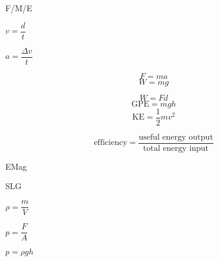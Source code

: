 \documentclass[11pt,a4paper]{article}
\begin{document}
\noindent\begin{paracol}{3}
F/M/E 
\switchcolumn 
\begin{center}
$v = \dfrac{d}{t}$
\end{center}
\switchcolumn
\begin{center}
$a = \dfrac{\Delta v}{t}$
\end{center}
\end{paracol}

\vspace*{1em}

\noindent\begin{paracol}{4}

\switchcolumn 
\[F = ma\]
\switchcolumn
\[W=mg\]
\end{paracol}

\vspace*{1em}

\noindent\begin{paracol}{4}

\switchcolumn 
\[W = Fd\]
\switchcolumn
\[\text{GPE}=mgh\]
\switchcolumn
\[\text{KE}=\frac{1}{2}mv^{2}\]
\end{paracol}

\vspace*{1em}

\noindent\begin{paracol}{2}

\switchcolumn 
\[\text{efficiency} = \frac{\text{useful energy output}}{\text{total energy input}}\]
\end{paracol}


\vspace*{1em}

\hrulefill

\vspace*{1em}

\noindent\begin{paracol}{4}
EMag
\end{paracol}

\vspace*{1em}

\hrulefill

\vspace*{1em}

\noindent\begin{paracol}{4}
SLG
\switchcolumn 
\begin{center}
$\rho = \dfrac{m}{V}$
\end{center}
\switchcolumn
\begin{center}
$p=\dfrac{F}{A}$
\end{center}
\switchcolumn
\begin{center}
$p=\rho g h$
\end{center}
\end{paracol}

\vfill
\end{document}
